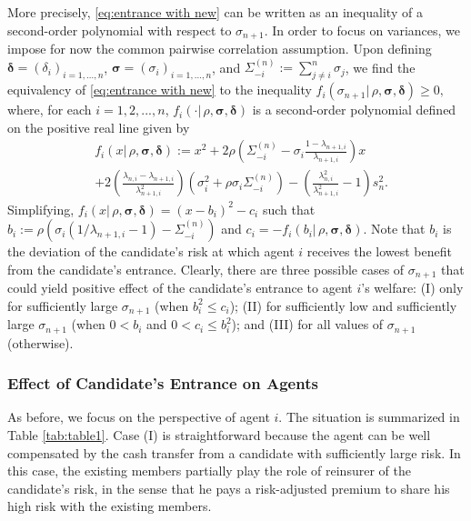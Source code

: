 \documentclass[fleqn,mnsc,nonblindrev]{informs4}
\begin{document}
More precisely, \eqref{eq:entrance with new} can be written as an inequality of a second-order polynomial with respect to $\sigma_{n+1}$. In order to focus on variances, we impose for now the common pairwise correlation assumption. Upon defining $\boldsymbol{\delta}=(\delta_i)_{i=1,...,n}$, $\boldsymbol{\sigma}=(\sigma_i)_{i=1,...,n}$, and $\Sigma^{(n)}_{-i}:=\sum_{j\neq i}^{n}\sigma_j$, we find the equivalency of \eqref{eq:entrance with new} to the inequality   {$f_i(\sigma_{n+1}|\,\rho,\boldsymbol{\sigma},\boldsymbol{\delta})\geq 0,$} where, for each 
$i=1,2,...,n$, $f_i(\cdot|\,\rho,\boldsymbol{\sigma},\boldsymbol{\delta})$ is a second-order polynomial defined on the positive real line given by
\begin{equation}
\begin{aligned}
&f_i(x|\,\rho,\boldsymbol{\sigma},\boldsymbol{\delta}):=x^2+2\rho\left(\Sigma^{(n)}_{-i}-\sigma_i\frac{1-\lambda_{n+1,i}}{\lambda_{n+1,i}}\right)x\\
&+2\left(\frac{\lambda_{n,i}-\lambda_{n+1,i}}{\lambda_{n+1,i}^2}\right)\left(\sigma_i^2+\rho\sigma_i\Sigma^{(n)}_{-i}\right)-\left( \frac{\lambda_{n,i}^2}{\lambda_{n+1,i}^2}- 1\right)s_n^2.
\end{aligned}
\label{eq:withsamecor}
\end{equation}
  {Simplifying, $f_i(x|\,\rho,\boldsymbol{\sigma},\boldsymbol{\delta})=(x-b_i)^2-c_i$ such that $b_i:=\rho\left(\sigma_i(1/\lambda_{n+1,i}-1)-\Sigma^{(n)}_{-i}\right)$ and $c_i=-f_i(b_i|\,\rho,\boldsymbol{\sigma},\boldsymbol{\delta}).$} Note that $b_i$ is the deviation of the candidate's risk at which agent $i$ receives the lowest benefit from the candidate's entrance. Clearly, there are three possible cases of $\sigma_{n+1}$ that could yield positive effect of the candidate's entrance to agent $i$'s welfare: (I) only for sufficiently large $\sigma_{n+1}$ (when $b_i^2\leq c_i $); (II) for sufficiently low and sufficiently large $\sigma_{n+1}$ (when $0<b_i$ and $0<c_i\leq b_i^2 $); and (III) for all values of $\sigma_{n+1}$ (otherwise).

\subsubsection*{Effect of Candidate's Entrance on Agents}

As before, we focus on the perspective of agent $i$. The situation is summarized in Table \ref{tab:table1}. Case (I) is straightforward because the agent can be well compensated by the cash transfer from a candidate with sufficiently large risk. In this case, the existing members partially play the role of reinsurer of the candidate's risk, in the sense that he pays a risk-adjusted premium to share his high risk with the existing members.
\end{document}

